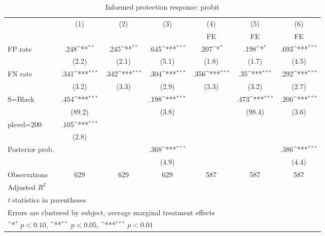 \begin{table}[htbp]\centering
\def\sym#1{\ifmmode^{#1}\else\(^{#1}\)\fi}
\caption{Informed protection response: probit}
\begin{tabular}{l*{6}{c}}
\hline\hline
                &\multicolumn{1}{c}{(1)}&\multicolumn{1}{c}{(2)}&\multicolumn{1}{c}{(3)}&\multicolumn{1}{c}{(4)}&\multicolumn{1}{c}{(5)}&\multicolumn{1}{c}{(6)}\\
                &\multicolumn{1}{c}{}&\multicolumn{1}{c}{}&\multicolumn{1}{c}{}&\multicolumn{1}{c}{FE}&\multicolumn{1}{c}{FE}&\multicolumn{1}{c}{FE}\\
\hline
FP rate         &     .248\sym{**} &     .245\sym{**} &     .645\sym{***}&     .207\sym{*}  &     .198\sym{*}  &     .693\sym{***}\\
                &    (2.2)         &    (2.1)         &    (5.1)         &    (1.8)         &    (1.7)         &    (4.5)         \\
FN rate         &     .341\sym{***}&     .342\sym{***}&     .304\sym{***}&     .356\sym{***}&      .35\sym{***}&     .292\sym{***}\\
                &    (3.2)         &    (3.3)         &    (2.9)         &    (3.3)         &    (3.2)         &    (2.7)         \\
S=Black         &     .454\sym{***}&                  &     .198\sym{***}&                  &     .473\sym{***}&     .206\sym{***}\\
                &   (89.2)         &                  &    (3.8)         &                  &   (98.4)         &    (3.6)         \\
plevel=200      &     .105\sym{***}&                  &                  &                  &                  &                  \\
                &    (2.8)         &                  &                  &                  &                  &                  \\
Posterior prob. &                  &                  &     .368\sym{***}&                  &                  &     .386\sym{***}\\
                &                  &                  &    (4.9)         &                  &                  &    (4.4)         \\
\hline
Observations    &      629         &      629         &      629         &      587         &      587         &      587         \\
Adjusted \(R^{2}\)&                  &                  &                  &                  &                  &                  \\
\hline\hline
\multicolumn{7}{l}{\footnotesize \textit{t} statistics in parentheses}\\
\multicolumn{7}{l}{\footnotesize Errors are clustered by subject, average marginal treatment effects}\\
\multicolumn{7}{l}{\footnotesize \sym{*} \(p<0.10\), \sym{**} \(p<0.05\), \sym{***} \(p<0.01\)}\\
\end{tabular}
\end{table}
